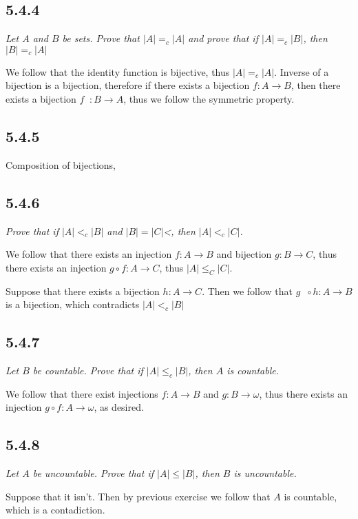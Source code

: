 \documentclass[11pt,oneside,titlepage]{book}
\DeclareMathOperator \inv {^{-1}}
\begin{document}
\subsection*{5.4.4}

\textit{Let $A$ and $B$ be sets. Prove that $|A| =_c |A|$ and prove that if $|A| =_c |B|$,
  then $|B| =_c |A|$}

We follow that the identity function is bijective, thus $|A| =_c |A|$. Inverse of a bijection
is a bijection, therefore if there exists  a bijection $f: A \to B$, then there
exists a bijection $f\inv: B \to A$, thus we follow the symmetric property.

\subsection*{5.4.5}

Composition of bijections,

\subsection*{5.4.6}

\textit{Prove that if $|A| <_c |B|$ and $|B|  = |C|$<, then $|A| <_c |C|$.}

We follow that there exists an injection $f: A \to B$ and bijection $g: B \to C$, thus
there exists an injection $g \circ f: A \to C$, thus $|A| \leq_C |C|$.

Suppose that there exists a bijection $h: A \to C$. Then we follow that $g\inv \circ h : A \to B$ is
a bijection, which contradicts $|A| <_c |B|$

\subsection*{5.4.7}

\textit{Let $B$ be countable. Prove that if $|A| \leq_c |B|$, then $A$ is countable.}

We follow that there exist injections $f: A \to B$ and $g: B \to \omega$, thus there
exists an injection $g \circ f: A \to \omega$, as desired.

\subsection*{5.4.8}

\textit{Let $A$ be uncountable. Prove that if $|A| \leq |B|$, then $B$ is uncountable.}

Suppose that it isn't. Then by previous exercise we follow that $A$ is countable, which
is a contadiction.
\end{document}
